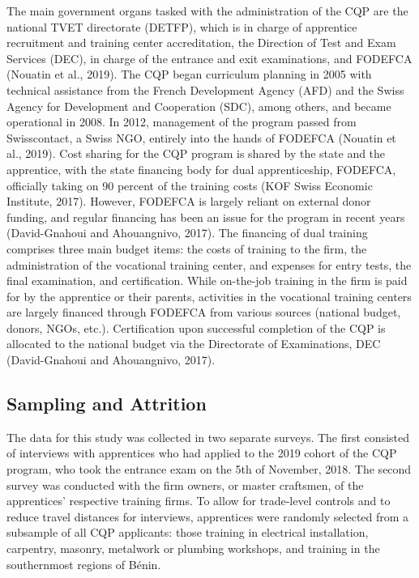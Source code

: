 \documentclass[
  11pt,
a4paper
]{report}
\begin{document}
The main government organs tasked with the administration of the CQP are the national TVET directorate (DETFP), which is in charge of apprentice recruitment and training center accreditation, the Direction of Test and Exam Services (DEC), in charge of the entrance and exit examinations, and FODEFCA (Nouatin et al., 2019). The CQP began curriculum planning in 2005 with technical assistance from the French Development Agency (AFD) and the Swiss Agency for Development and Cooperation (SDC), among others, and became operational in 2008. In 2012, management of the program passed from Swisscontact, a Swiss NGO, entirely into the hands of FODEFCA (Nouatin et al., 2019). Cost sharing for the CQP program is shared by the state and the apprentice, with the state financing body for dual apprenticeship, FODEFCA, officially taking on 90 percent of the training costs (KOF Swiss Economic Institute, 2017). However, FODEFCA is largely reliant on external donor funding, and regular financing has been an issue for the program in recent years (David-Gnahoui and Ahouangnivo, 2017). The financing of dual training comprises three main budget items: the costs of training to the firm, the administration of the vocational training center, and expenses for entry tests, the final examination, and certification. While on-the-job training in the firm is paid for by the apprentice or their parents, activities in the vocational training centers are largely financed through FODEFCA from various sources (national budget, donors, NGOs, etc.). Certification upon successful completion of the CQP is allocated to the national budget via the Directorate of Examinations, DEC (David-Gnahoui and Ahouangnivo, 2017).

\hypertarget{sampling-and-attrition}{%
\subsection{Sampling and Attrition}\label{sampling-and-attrition}}

The data for this study was collected in two separate surveys. The first consisted of interviews with apprentices who had applied to the 2019 cohort of the CQP program, who took the entrance exam on the 5th of November, 2018. The second survey was conducted with the firm owners, or master craftsmen, of the apprentices' respective training firms. To allow for trade-level controls and to reduce travel distances for interviews, apprentices were randomly selected from a subsample of all CQP applicants: those training in electrical installation, carpentry, masonry, metalwork or plumbing workshops, and training in the southernmost regions of Bénin.
\end{document}
